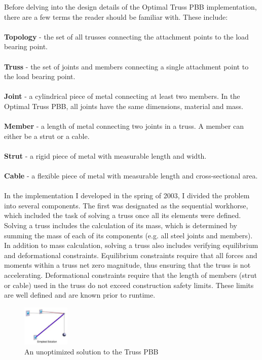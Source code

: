\documentclass[11pt,twocolumn]{article}
\begin{document}
Before delving into the design details of the Optimal Truss PBB
implementation, there are a few terms the reader should be familiar
with.  These include:
\\
\\
{\bf Topology} - the set of all trusses connecting the attachment points to
the load bearing point.
\\ \\
{\bf Truss} - the set of joints and members connecting a single
attachment point to the load bearing point.
\\ \\
{\bf Joint} - a cylindrical piece of metal
connecting at least two members.  In the Optimal Truss PBB, all joints
have the same dimensions, material and mass.  
\\ \\
{\bf Member} - a length of metal connecting two joints in a truss.  A member
can either be a strut or a cable.
\\ \\
{\bf Strut} - a rigid piece of metal with measurable length and width.
\\ \\
{\bf Cable} - a flexible piece of metal with measurable length and
cross-sectional area.
\\ \\
In the implementation I developed in the spring of 2003, I divided
the problem into several components.  The first was designated as the
sequential workhorse, which included the task of solving a truss once
all its elements were defined.  Solving a truss includes the
calculation of its mass, which is determined by summing the mass of each of its
components (e.g. all steel joints and members).  In addition to mass
calculation, solving a truss also includes verifying equilibrium and
deformational constraints.  Equilibrium constraints require that all
forces and moments within a truss net zero magnitude, thus ensuring
that the truss is not accelerating.  Deformational constraints require
that the length of members (strut or cable) used in the truss do not
exceed construction safety limits.  These limits are well defined and
are known prior to runtime.

\begin{figure}[h]
  \centering
  \includegraphics[width=0.2\textwidth]{simple_truss.eps}
  \caption{An unoptimized solution to the Truss PBB}
  \label{fig:simple_truss}
\end{figure}
\end{document}
